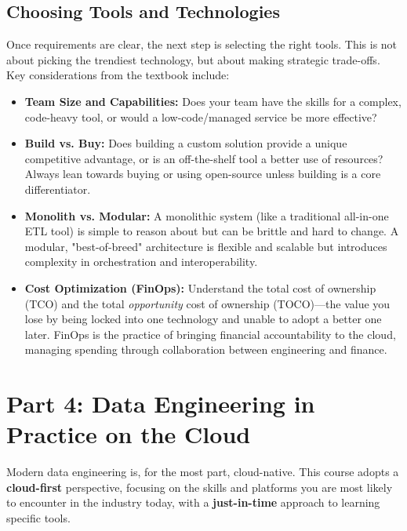 \documentclass{article}
\begin{document}
\subsection{Choosing Tools and Technologies}
Once requirements are clear, the next step is selecting the right tools. This is not about picking the trendiest technology, but about making strategic trade-offs. Key considerations from the textbook include:
\begin{itemize}
    \item \textbf{Team Size and Capabilities:} Does your team have the skills for a complex, code-heavy tool, or would a low-code/managed service be more effective?
    \item \textbf{Build vs. Buy:} Does building a custom solution provide a unique competitive advantage, or is an off-the-shelf tool a better use of resources? Always lean towards buying or using open-source unless building is a core differentiator.
    \item \textbf{Monolith vs. Modular:} A monolithic system (like a traditional all-in-one ETL tool) is simple to reason about but can be brittle and hard to change. A modular, "best-of-breed" architecture is flexible and scalable but introduces complexity in orchestration and interoperability.
    \item \textbf{Cost Optimization (FinOps):} Understand the total cost of ownership (TCO) and the total \textit{opportunity} cost of ownership (TOCO)—the value you lose by being locked into one technology and unable to adopt a better one later. FinOps is the practice of bringing financial accountability to the cloud, managing spending through collaboration between engineering and finance.
\end{itemize}


\newpage
\section{Part 4: Data Engineering in Practice on the Cloud}

Modern data engineering is, for the most part, cloud-native. This course adopts a \textbf{cloud-first} perspective, focusing on the skills and platforms you are most likely to encounter in the industry today, with a \textbf{just-in-time} approach to learning specific tools.
\end{document}
